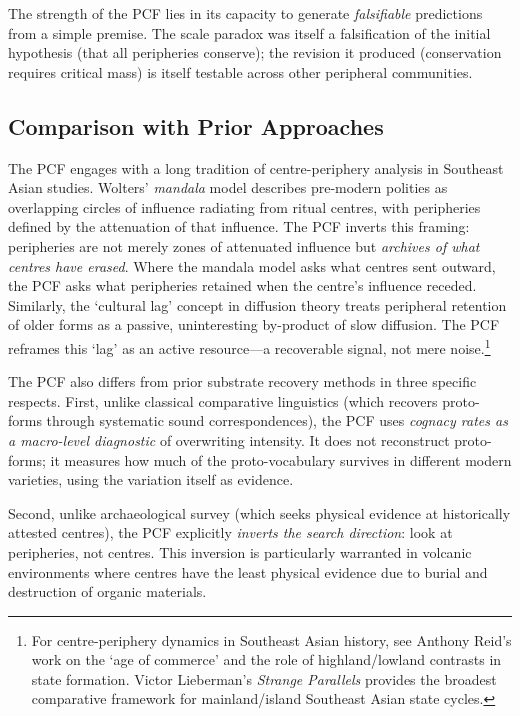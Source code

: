 \documentclass[12pt,a4paper]{article}
\begin{document}
The strength of the PCF lies in its capacity to generate \emph{falsifiable} predictions from a simple premise. The scale paradox was itself a falsification of the initial hypothesis (that all peripheries conserve); the revision it produced (conservation requires critical mass) is itself testable across other peripheral communities.

\subsection{Comparison with Prior Approaches}

The PCF engages with a long tradition of centre-periphery analysis in Southeast Asian studies. Wolters' \emph{mandala} model describes pre-modern polities as overlapping circles of influence radiating from ritual centres, with peripheries defined by the attenuation of that influence. The PCF inverts this framing: peripheries are not merely zones of attenuated influence but \emph{archives of what centres have erased}. Where the mandala model asks what centres sent outward, the PCF asks what peripheries retained when the centre's influence receded. Similarly, the `cultural lag' concept in diffusion theory treats peripheral retention of older forms as a passive, uninteresting by-product of slow diffusion. The PCF reframes this `lag' as an active resource---a recoverable signal, not mere noise.\footnote{For centre-periphery dynamics in Southeast Asian history, see Anthony Reid's work on the `age of commerce' and the role of highland/lowland contrasts in state formation. Victor Lieberman's \emph{Strange Parallels} provides the broadest comparative framework for mainland/island Southeast Asian state cycles.}

The PCF also differs from prior substrate recovery methods in three specific respects. First, unlike classical comparative linguistics (which recovers proto-forms through systematic sound correspondences), the PCF uses \emph{cognacy rates as a macro-level diagnostic} of overwriting intensity. It does not reconstruct proto-forms; it measures how much of the proto-vocabulary survives in different modern varieties, using the variation itself as evidence.

Second, unlike archaeological survey (which seeks physical evidence at historically attested centres), the PCF explicitly \emph{inverts the search direction}: look at peripheries, not centres. This inversion is particularly warranted in volcanic environments where centres have the least physical evidence due to burial and destruction of organic materials.
\end{document}
